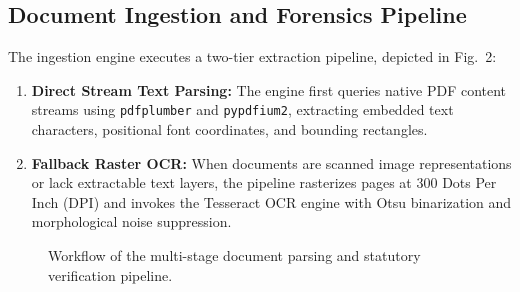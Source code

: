 \documentclass[conference]{IEEEtran}
\begin{document}
\subsection{Document Ingestion and Forensics Pipeline}
The ingestion engine executes a two-tier extraction pipeline, depicted in Fig.~2:
\begin{enumerate}
    \item \textbf{Direct Stream Text Parsing:} The engine first queries native PDF content streams using \texttt{pdfplumber} and \texttt{pypdfium2}, extracting embedded text characters, positional font coordinates, and bounding rectangles.
    \item \textbf{Fallback Raster OCR:} When documents are scanned image representations or lack extractable text layers, the pipeline rasterizes pages at 300 Dots Per Inch (DPI) and invokes the Tesseract OCR engine with Otsu binarization and morphological noise suppression.
\end{enumerate}

\begin{figure}[!ht]
\centering
{}
\caption{Workflow of the multi-stage document parsing and statutory verification pipeline.}
\label{fig:pipeline}
\end{figure}
\end{document}
